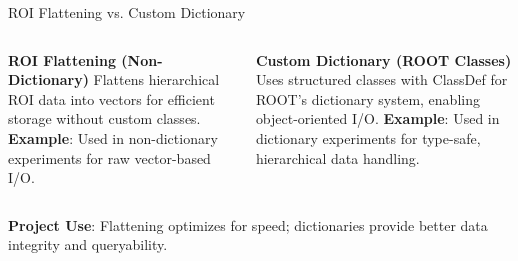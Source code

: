 \documentclass[aspectratio=169]{beamer}
\begin{document}
\begin{frame}{ROI Flattening vs. Custom Dictionary}
  \begin{columns}
    \textbf{ROI Flattening (Non-Dictionary)}
    \small Flattens hierarchical ROI data into vectors for efficient storage without custom classes.
    \vspace{0.5em}
    \vspace{0.5em}
    \textbf{Example}: Used in non-dictionary experiments for raw vector-based I/O.

    \textbf{Custom Dictionary (ROOT Classes)}
    \small Uses structured classes with ClassDef for ROOT's dictionary system, enabling object-oriented I/O.
    \vspace{0.5em}
    \vspace{0.5em}
    \textbf{Example}: Used in dictionary experiments for type-safe, hierarchical data handling.
  \end{columns}
  \vspace{1em}
  \textbf{Project Use}: Flattening optimizes for speed; dictionaries provide better data integrity and queryability.
\end{frame}
\end{document}
